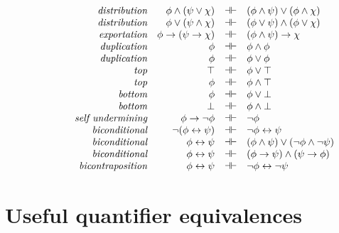 \[\begin{array}{>{\raggedleft\it}p{4cm}rcl}
distribution & \phi\wedge (\psi\vee \chi) &\dashv\vdash & (\phi\wedge \psi)\vee (\phi\wedge \chi) \\
distribution & \phi\vee (\psi\wedge \chi) &\dashv\vdash & (\phi\vee \psi)\wedge (\phi\vee \chi) \\
exportation & \phi\to (\psi\to \chi) & \dashv\vdash & (\phi\wedge \psi)\to \chi \\
duplication & \phi & \dashv\vdash & \phi\wedge \phi \\
duplication & \phi & \dashv\vdash & \phi\vee \phi \\
top & \top & \dashv\vdash & \phi\vee\top   \\
top & \phi & \dashv\vdash & \phi\wedge\top    \\
bottom &     \phi & \dashv\vdash & \phi\vee \bot   \\ 
bottom &      \bot & \dashv\vdash & \phi\wedge\bot  \\
self undermining  &     \phi\to \neg \phi & \dashv\vdash & \neg \phi  \\
biconditional  &     \neg (\phi\lra \psi) & \dashv\vdash & \neg \phi\lra \psi  \\
biconditional &      \phi\lra \psi & \dashv\vdash & (\phi\wedge \psi)\vee (\neg \phi\wedge \neg \psi)  \\
biconditional &      \phi\lra \psi & \dashv\vdash & (\phi\to \psi)\wedge (\psi\to \phi ) \\
     bicontraposition &      \phi\lra \psi & \dashv\vdash & \neg \phi\lra\neg \psi  \end{array} \]
 
\section{Useful quantifier equivalences}

